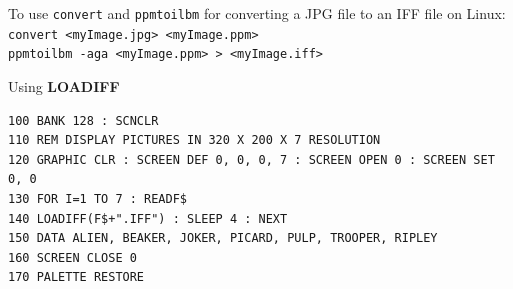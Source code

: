 \begin{description}[leftmargin=2cm,style=nextline]
                  To use \texttt{convert} and \texttt{ppmtoilbm} for converting a JPG file to an IFF file on Linux: \\
                  \texttt{convert <myImage.jpg> <myImage.ppm>} \\
                  \texttt{ppmtoilbm -aga <myImage.ppm> > <myImage.iff>}

\item [Example:]  Using {\bf LOADIFF}

\begin{tcolorbox}[colback=black,coltext=white]
\verbatimfont{\codefont}
\begin{verbatim}
100 BANK 128 : SCNCLR
110 REM DISPLAY PICTURES IN 320 X 200 X 7 RESOLUTION
120 GRAPHIC CLR : SCREEN DEF 0, 0, 0, 7 : SCREEN OPEN 0 : SCREEN SET 0, 0
130 FOR I=1 TO 7 : READF$
140 LOADIFF(F$+".IFF") : SLEEP 4 : NEXT
150 DATA ALIEN, BEAKER, JOKER, PICARD, PULP, TROOPER, RIPLEY
160 SCREEN CLOSE 0
170 PALETTE RESTORE
\end{verbatim}
\end{tcolorbox}
\end{description}


\newpage
